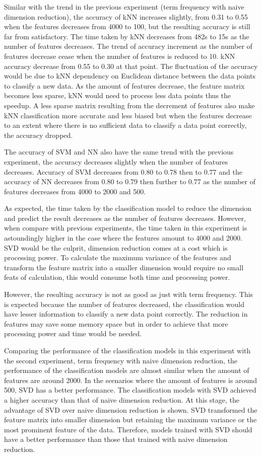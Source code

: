 Similar with the trend in the previous experiment (term frequency with naive dimension reduction), the accuracy of kNN increases slightly, from 0.31 to 0.55 when the features decreases from 4000 to 100, but the resulting accuracy is still far from satisfactory. The time taken by kNN decreases from 482s to 15s as the number of features decreases. The trend of accuracy increment as the number of features decrease cease when the number of features is reduced to 10. kNN accuracy decrease from 0.55 to 0.30 at that point. The fluctuation of the accuracy would be due to kNN dependency on Euclidean distance between the data points to classify a new data. As the amount of features decrease, the feature matrix becomes less sparse, kNN would need to process less data points thus the speedup. A less sparse matrix resulting from the decrement of features also make kNN classification more accurate and less biased but when the features decrease to an extent where there is no sufficient data to classify a data point correctly, the accuracy dropped.

The accuracy of SVM and NN also have the same trend with the previous experiment, the accuracy decreases slightly when the number of features decreases. Accuracy of SVM decreases from 0.80 to 0.78 then to 0.77 and the accuracy of NN decreases from 0.80 to 0.79 then further to 0.77 as the number of features decreases from 4000 to 2000 and 500.

As expected, the time taken by the classification model to reduce the dimension and predict the result decreases as the number of features decreases. However, when compare with previous experiments, the time taken in this experiment is astoundingly higher in the case where the features amount to 4000 and 2000. SVD would be the culprit, dimension reduction comes at a cost which is processing power. To calculate the maximum variance of the features and transform the feature matrix into a smaller dimension would require no small feats of calculation, this would consume both time and processing power.

However, the resulting accuracy is not as good as just with term frequency. This is expected because the number of features decreased, the classification would have lesser information to classify a new data point correctly. The reduction in features may save some memory space but in order to achieve that more processing power and time would be needed.

Comparing the performance of the classification models in this experiment with the second experiment, term frequency with naive dimension reduction, the performance of the classification models are almost similar when the amount of features are around 2000. In the scenarios where the amount of features is around 500, SVD has a better performance. The classification models with SVD achieved a higher accuracy than that of naive dimension reduction. At this stage, the advantage of SVD over naive dimension reduction is shown. SVD transformed the feature matrix into smaller dimension but retaining the maximum variance or the most prominent feature of the data. Therefore, models trained with SVD should have a better performance than those that trained with naive dimension reduction.

